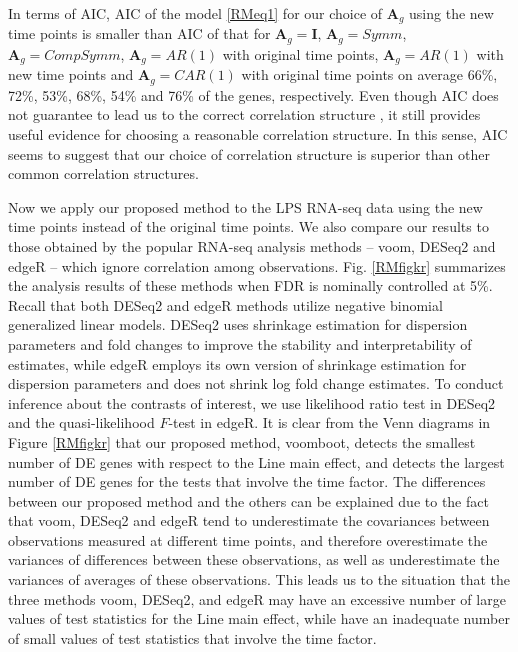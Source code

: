 In terms of AIC, AIC of the model \eqref{RMeq1} for our choice of $\boldsymbol{A}_g$ using the new time points is smaller than AIC of that for $\boldsymbol{A}_g = \boldsymbol{I}$, $\boldsymbol{A}_g = Symm$,   $\boldsymbol{A}_g = CompSymm$, $\boldsymbol{A}_g = AR(1)$ with original time points, $\boldsymbol{A}_g = AR(1)$ with new time points and $\boldsymbol{A}_g = CAR(1)$ with original time points on average
66\%, 72\%, 53\%, 68\%, 54\% and 76\% of the genes, respectively. Even though AIC does not guarantee to lead us to the correct correlation structure \citep{Keselman1998}, it still provides useful evidence for choosing a reasonable correlation structure. In this sense, AIC seems to suggest that our choice of correlation structure is superior than  other common correlation structures.

Now we  apply our proposed method to the LPS RNA-seq data using the new time points instead of the original time points. We also compare our results to those obtained by the popular RNA-seq analysis methods -- voom, DESeq2 and edgeR -- which ignore correlation among observations. Fig. \ref{RMfigkr} summarizes the analysis results of these methods when  FDR is nominally controlled at 5\%. Recall that both DESeq2  and edgeR methods utilize  negative binomial generalized linear models.  DESeq2 uses shrinkage estimation for dispersion parameters and fold changes to improve the stability and interpretability of estimates, while edgeR employs its own version of 
shrinkage estimation for dispersion parameters and does not shrink log fold change estimates. To conduct inference about the contrasts of interest, we use likelihood ratio test in DESeq2 and the quasi-likelihood $F$-test in edgeR. It is clear from the Venn diagrams  in Figure \ref{RMfigkr} that our proposed method, voomboot, detects the smallest number of DE genes with respect to the Line main effect, and detects the largest number of DE genes for the tests that involve the time factor. The differences between our proposed method and the others can be explained due to the fact that voom, DESeq2 and edgeR tend to  underestimate the covariances between observations measured at different time points, and therefore overestimate the variances of differences between these observations, as well as underestimate the variances of averages of these observations. This  leads us  to the situation that the three methods voom, DESeq2, and edgeR may have an excessive number of large  values of test statistics for the Line main effect, while have  an inadequate number of small values of test statistics that involve the time factor. 

